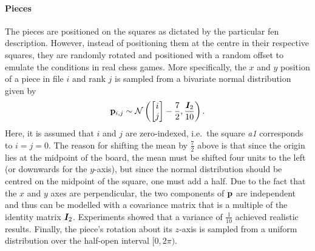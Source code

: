 \documentclass[../report.tex]{subfiles}
\begin{document}
\paragraph{Pieces}
The pieces are positioned on the squares as dictated by the particular \gls{fen} description.
However, instead of positioning them at the centre in their respective squares, they are randomly rotated and positioned with a random offset to emulate the conditions in real chess games.
More specifically, the $x$ and $y$ position of a piece in file $i$ and rank $j$ is sampled from a bivariate normal distribution given by
\begin{equation*}
    {\mathbf{p}}_{i,j} \sim \mathcal{N} \left(
        \begin{bmatrix}
            i \\ j
        \end{bmatrix} - \frac{7}{2},
        \frac{{\bm{I}}_2}{10}
    \right).
\end{equation*}
Here, it is assumed that $i$ and $j$ are zero-indexed, i.e.\ the square \emph{a1} corresponds to $i=j=0$.
The reason for shifting the mean by $\frac{7}{2}$ above is that since the origin lies at the midpoint of the board, the mean must be shifted four units to the left (or downwards for the $y$-axis), but since the normal distribution should be centred on the midpoint of the square, one must add a half.
Due to the fact that the $x$ and $y$ axes are perpendicular, the two components of ${\mathbf{p}}$ are independent and thus can be modelled with a covariance matrix that is a multiple of the identity matrix ${\bm{I}}_2$.
Experiments showed that a variance of $\frac{1}{10}$ achieved realistic results.
Finally, the piece's rotation about its $z$-axis is sampled from a uniform distribution over the half-open interval $[0, 2\pi)$.
\end{document}
